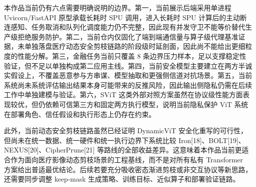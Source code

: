 本作品当前仍有六点需要明确说明的边界。第一，当前展示后端采用单进程 Uvicorn/FastAPI 原型承载长耗时 SPU 调用，进入长耗时 SPU 计算后的主动断连感知、任务取消和队列化调度能力仍不完整，因此现有并发守卫不能等价替代生产级拒绝服务防护。第二，当前仓内仅固化了端到端通信量与算子级代理基准证据，未单独落盘医疗动态安全剪枝链路的阶段级时延剖面，因此尚不能给出更细粒度的性能分解。第三，金融任务当前只覆盖 8 条边界压力样本，足以支撑稳定性验证，但不足以单独构成第二应用主线。第四，当前安全模型主要建立在两方半诚实假设上，不覆盖恶意参与方串谋、模型抽取和更强侧信道对抗场景。第五，当前系统尚未系统评估输出结果本身可能带来的反推风险，因此输出侧隐私仍需在后续工作中单独建模与验证。第六，SViT 这类外部对照方案虽然在协议级性能方面表现较优，但仍依赖可信第三方和固定两方执行模型，说明当前隐私保护 ViT 系统在部署角色、信任假设和执行形态上仍存在约束。

此外，当前动态安全剪枝链路虽然已经证明 DynamicViT 安全化重写的可行性，但尚未在统一数据、统一硬件和统一执行边界下系统比较 Iron[18]、BOLT[19]、NEXUS[20]、CipherPrune[21] 等路线的全部收益差异。这意味着本作品当前更适合作为面向医疗影像动态剪枝场景的工程基线，而不是对所有私有 Transformer 方案给出普适最优结论。后续若要充分吸收密态渐进剪枝或非交互协议等新思路，还需要同步调整 keep-mask 生成策略、训练目标、近似算子和部署验证链路。
